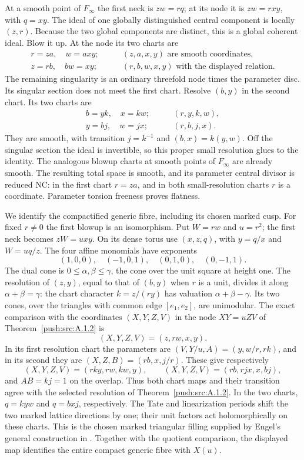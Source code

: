 \item At a smooth point of $F_\infty$ the first neck is $zw=rq$; at its node it is $zw=rxy$, with $q=xy$. The ideal of one globally distinguished central component is locally $(z,r)$. Because the two global components are distinct, this is a global coherent ideal. Blow it up. At the node its two charts are
\begin{align*}
 r=za,\quad w=axy;&\qquad (z,a,x,y)\text{ are smooth coordinates},\\
 z=rb,\quad bw=xy;&\qquad (r,b,w,x,y)\text{ with the displayed relation}.
\end{align*}
The remaining singularity is an ordinary threefold node times the parameter disc. Its singular section does not meet the first chart. Resolve $(b,y)$ in the second chart. Its two charts are
\begin{align*}
 b=yk,\quad x=kw;&\qquad (r,y,k,w),\\
 y=bj,\quad w=jx;&\qquad (r,b,j,x).
\end{align*}
They are smooth, with transition $j=k^{-1}$ and $(b,x)=k(y,w)$. Off the singular section the ideal is invertible, so this proper small resolution glues to the identity. The analogous blowup charts at smooth points of $F_\infty$ are already smooth. The resulting total space is smooth, and its parameter central divisor is reduced NC: in the first chart $r=za$, and in both small-resolution charts $r$ is a coordinate. Parameter torsion freeness proves flatness.

\item We identify the compactified generic fibre, including its chosen marked cusp. For fixed $r\ne0$ the first blowup is an isomorphism. Put $W=rw$ and $u=r^2$; the first neck becomes $zW=u xy$. On its dense torus use $(x,z,q)$, with $y=q/x$ and $W=uq/z$. The four affine monomials have exponents
\[
 (1,0,0),\quad(-1,0,1),\quad(0,1,0),\quad(0,-1,1).
\]
The dual cone is $0\le\alpha,\beta\le\gamma$, the cone over the unit square at height one. The resolution of $(z,y)$, equal to that of $(b,y)$ when $r$ is a unit, divides it along $\alpha+\beta=\gamma$: the chart character $k=z/(ry)$ has valuation $\alpha+\beta-\gamma$. Its two cones, over the triangles with common edge $[e_1,e_2]$, are unimodular. The exact comparison with the coordinates $(X,Y,Z,V)$ in the node $XY=uZV$ of Theorem~\ref{push:src:A.1.2} is
\[
 (X,Y,Z,V)=(z,rw,x,y).
\]
In its first resolution chart the parameters are $(V,Y/u,A)=(y,w/r,rk)$, and in its second they are $(X,Z,B)=(rb,x,j/r)$. These give respectively
\[
 (X,Y,Z,V)=(rk y,rw,kw,y),\qquad
 (X,Y,Z,V)=(rb,rjx,x,bj),
\]
and $AB=kj=1$ on the overlap. Thus both chart maps and their transition agree with the selected resolution of Theorem~\ref{push:src:A.1.2}. In the two charts, $q=kyw$ and $q=bxj$, respectively. The Tate and linearization periods shift the two marked lattice directions by one; their unit factors act holomorphically on these charts. This is the chosen marked triangular filling supplied by Engel's general construction in \cite[Proposition~2.8, pp.~6--7]{Engel2026}. Together with the quotient comparison, the displayed map identifies the entire compact generic fibre with $X(u)$.

